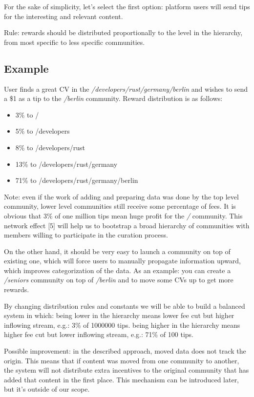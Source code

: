 \documentclass[10pt,a4paper]{article}
\begin{document}
For the sake of simplicity, let’s select the first option: platform users will send tips for the interesting and relevant content.\newline

Rule: rewards should be distributed proportionally to the level in the hierarchy, from most specific to less specific communities.

\subsection{Example}

User finds a great CV in the {\em /developers/rust/germany/berlin} and wishes to send a \$1 as a tip to the {\em /berlin} community. Reward distribution is as follows:

\begin{itemize}
    \item 3\% to /
    \item 5\% to /developers
    \item 8\% to /developers/rust
    \item 13\% to /developers/rust/germany
    \item 71\% to /developers/rust/germany/berlin
\end{itemize}

Note: even if the work of adding and preparing data was done by the top level community, lower level communities still receive some percentage of fees. It is obvious that 3\% of one million tips mean huge profit for the {\em /} community. This network effect [5] will help us to bootstrap a broad hierarchy of communities with members willing to participate in the curation process.

On the other hand, it should be very easy to launch a community on top of existing one, which will force users to manually propagate information upward, which improves categorization of the data. As an example: you can create a {\em /seniors} community on top of {\em /berlin} and to move some CVs up to get more rewards.

By changing distribution rules and constants we will be able to build a balanced system in which:
being lower in the hierarchy means lower fee cut but higher inflowing stream, e.g.: 3\% of 1000000 tips.
being higher in the hierarchy means higher fee cut but lower inflowing stream, e.g.: 71\% of 100 tips.\newline

Possible improvement: in the described approach, moved data does not track the origin. This means that if content was moved from one community to another, the system will not distribute extra incentives to the original community that has added that content in the first place. This mechanism can be introduced later, but it’s outside of our scope.\newline
\end{document}
